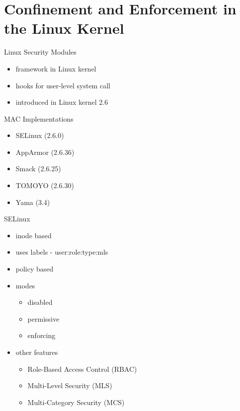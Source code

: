 \documentclass{curs}
\begin{document}
\section{Confinement and Enforcement in the Linux Kernel}

\begin{frame}{Linux Security Modules}
  \begin{itemize}
    \item framework in Linux kernel
    \item hooks for user-level system call
    \item introduced in Linux kernel 2.6
  \end{itemize}
\end{frame}

\begin{frame}{MAC Implementations}
  \begin{itemize}
    \item SELinux (2.6.0)
    \item AppArmor (2.6.36)
    \item Smack (2.6.25)
    \item TOMOYO (2.6.30)
    \item Yama (3.4)
  \end{itemize}
\end{frame}

\begin{frame}{SELinux}
  \begin{itemize}
    \item inode based
    \item uses labels - user:role:type:mls
    \item policy based
    \item modes
      \begin{itemize}
        \item disabled
        \item permissive
        \item enforcing
      \end{itemize}
    \item other features
      \begin{itemize}
        \item Role-Based Access Control (RBAC)
        \item Multi-Level Security (MLS)
        \item Multi-Category Security (MCS)
      \end{itemize}
  \end{itemize}
\end{frame}
\end{document}
